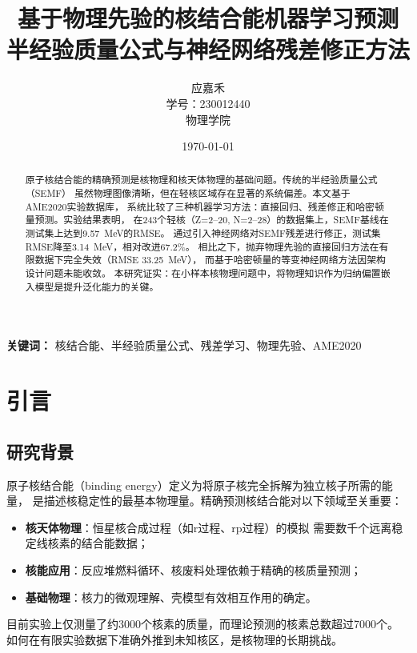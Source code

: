\documentclass[12pt, a4paper]{article}
\title{%
  \vspace{-1cm}
  \textbf{基于物理先验的核结合能机器学习预测} \\[0.5em]
  \large 半经验质量公式与神经网络残差修正方法
}
\author{
  应嘉禾 \\
  学号：230012440 \\
  物理学院
}
\date{\today}
\begin{document}
\maketitle

\begin{abstract}
原子核结合能的精确预测是核物理和核天体物理的基础问题。传统的半经验质量公式（SEMF）
虽然物理图像清晰，但在轻核区域存在显著的系统偏差。本文基于AME2020实验数据库，
系统比较了三种机器学习方法：直接回归、残差修正和哈密顿量预测。实验结果表明，
在243个轻核（Z=2--20, N=2--28）的数据集上，SEMF基线在测试集上达到9.57~MeV的RMSE。
通过引入神经网络对SEMF残差进行修正，测试集RMSE降至3.14~MeV，相对改进67.2\%。
相比之下，抛弃物理先验的直接回归方法在有限数据下完全失效（RMSE 33.25~MeV），
而基于哈密顿量的等变神经网络方法因架构设计问题未能收敛。
本研究证实：在小样本核物理问题中，将物理知识作为归纳偏置嵌入模型是提升泛化能力的关键。
\end{abstract}

\vspace{0.5em}
\noindent\textbf{关键词：} 核结合能、半经验质量公式、残差学习、物理先验、AME2020

\tableofcontents
\newpage


\section{引言}
\label{sec:intro}

\subsection{研究背景}

原子核结合能（binding energy）定义为将原子核完全拆解为独立核子所需的能量，
是描述核稳定性的最基本物理量。精确预测核结合能对以下领域至关重要：

\begin{itemize}
  \item \textbf{核天体物理}：恒星核合成过程（如r过程、rp过程）的模拟
        需要数千个远离稳定线核素的结合能数据；
  \item \textbf{核能应用}：反应堆燃料循环、核废料处理依赖于精确的核质量预测；
  \item \textbf{基础物理}：核力的微观理解、壳模型有效相互作用的确定。
\end{itemize}

目前实验上仅测量了约3000个核素的质量，而理论预测的核素总数超过7000个。
如何在有限实验数据下准确外推到未知核区，是核物理的长期挑战。
\end{document}
